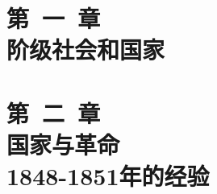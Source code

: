 \documentclass{CR} %
\begin{document}
 
\clearpage\thispagestyle{empty}\cleardoublepage





\frontmatter

\pagestyle{plain}
\tableofcontents 
\clearpage\thispagestyle{empty}\cleardoublepage

\mainmatter

\pagestyle{headings}

\clearpage\thispagestyle{empty}\cleardoublepage %






\clearpage\thispagestyle{empty}\cleardoublepage

\part[第一章]{第~一~章 \\ 阶级社会和国家}  
\leftskip=0pt



\part[第二章]{第~二~章 \\ 国家与革命\\ 1848-1851年的经验}  
\end{document}
